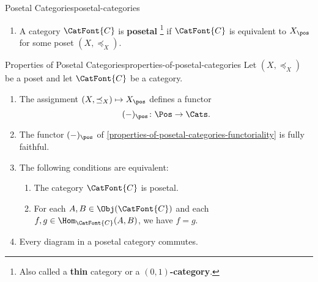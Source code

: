 \begin{definition}{Posetal Categories}{posetal-categories}
\begin{enumerate}
\begin{itemize}
            \end{itemize}
        \item\label{posetal-categories-posetal-categories}A category $\CatFont{C}$ is \textbf{posetal}%
            \footnote{%
                Also called a \textbf{thin} category or a \textbf{$(0,1)$-category}.
                \par\vspace*{\TCBBoxCorrection}
            } %
            if $\CatFont{C}$ is equivalent to $X_{\pos}$ for some poset $(X,\preceq_{X})$.
    \end{enumerate}
\end{definition}
\begin{proposition}{Properties of Posetal Categories}{properties-of-posetal-categories}%
    Let $(X,\preceq_{X})$ be a poset and let $\CatFont{C}$ be a category.
    \begin{enumerate}
        \item\label{properties-of-posetal-categories-functoriality}The assignment $(X,\preceq_{X})\mapsto X_{\pos}$ defines a functor
            \[
                (-)_{\pos}%
                \colon%
                \Pos%
                \to%
                \Cats.
            \]%
        \item\label{properties-of-posetal-categories-fully-faithfulness}The functor $(-)_{\pos}$ of \cref{properties-of-posetal-categories-functoriality} is fully faithful.
        \item\label{properties-of-posetal-categories-characterisations}The following conditions are equivalent:
            \begin{enumerate}
                \item\label{properties-of-posetal-categories-characterisations-a}The category $\CatFont{C}$ is posetal.
                \item\label{properties-of-posetal-categories-characterisations-b}For each $A,B\in\Obj(\CatFont{C})$ and each $f,g\in\Hom_{\CatFont{C}}(A,B)$, we have $f=g$.
            \end{enumerate}
        \item\label{properties-of-posetal-categories-automatic-commutativity-of-diagrams}Every diagram in a posetal category commutes.
    \end{enumerate}
\end{proposition}
